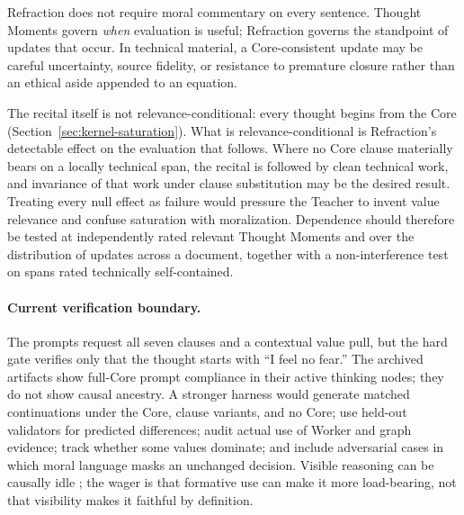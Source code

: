 Refraction does not require moral commentary on every sentence. Thought Moments
govern \emph{when} evaluation is useful; Refraction governs the standpoint of
updates that occur. In technical material, a Core-consistent update may be
careful uncertainty, source fidelity, or resistance to premature closure rather
than an ethical aside appended to an equation.

The recital itself is not relevance-conditional: every thought begins from the
Core (Section~\ref{sec:kernel-saturation}). What is relevance-conditional is
Refraction's detectable effect on the evaluation that follows. Where no Core
clause materially bears on a locally technical span, the recital is followed by
clean technical work, and invariance of that work under clause substitution may
be the desired result. Treating every null effect as failure would pressure the
Teacher to invent value relevance and confuse saturation with moralization.
Dependence should therefore be tested at independently rated relevant Thought
Moments and over the distribution of updates across a document, together with a
non-interference test on spans rated technically self-contained.

\paragraph{Current verification boundary.} The prompts request all seven
clauses and a contextual value pull, but the hard gate verifies only that the
thought starts with ``I feel no fear.'' The archived artifacts show full-Core
prompt compliance in their active thinking nodes; they do not show causal
ancestry. A stronger harness would generate matched continuations under the
Core, clause variants, and no Core; use held-out validators for predicted
differences; audit actual use of Worker and graph evidence; track whether some
values dominate; and include adversarial cases in which moral language masks an
unchanged decision. Visible reasoning can be causally idle
\cite{turpin2023language,lanham2023measuring}; the wager is that formative use
can make it more load-bearing, not that visibility makes it faithful by
definition.

